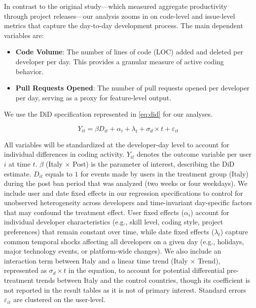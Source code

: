 In contrast to the original study---which measured aggregate productivity through project releases---our analysis zooms in on code-level and issue-level metrics that capture the day-to-day development process. The main dependent variables are:

\begin{itemize}
  \item \textbf{Code Volume}: The number of lines of code (LOC) added and deleted per developer per day. This provides a granular measure of active coding behavior.
  \item \textbf{Pull Requests Opened}: The number of pull requests opened per developer per day, serving as a proxy for feature-level output.
\end{itemize}

We use the DiD specification represented in \autoref{eq:did} for our analyses.

\begin{equation}
  Y_{it} = \beta D_{it} + \alpha_{i} + \lambda_{t} + \sigma_{d} \times t + \varepsilon_{it}
  \label{eq:did}
\end{equation}

All variables will be standardized at the developer-day level to account for individual differences in coding activity. $Y_{it}$ denotes the outcome variable per user $i$ at time $t$. $\beta$ (Italy × Post) is the parameter of interest, describing the DiD estimate. $D_{it}$ equals to $1$ for events made by users in the treatment group (Italy) during the post ban period that was analyzed (two weeks or four weekdays). We include user and date fixed effects in our regression specifications to control for unobserved heterogeneity across developers and time-invariant day-specific factors that may confound the treatment effect. User fixed effects ($\alpha_{i}$) account for individual developer characteristics (e.g., skill level, coding style, project preferences) that remain constant over time, while date fixed effects ($\lambda_{t}$) capture common temporal shocks affecting all developers on a given day (e.g., holidays, major technology events, or platform-wide changes). We also include an interaction term between Italy and a linear time trend (Italy × Trend), represented as $\sigma_{d} \times t$ in the equation, to account for potential differential pre-treatment trends between Italy and the control countries, though its coefficient is not reported in the result tables as it is not of primary interest. Standard errors $\varepsilon_{it}$ are clustered on the user-level.

